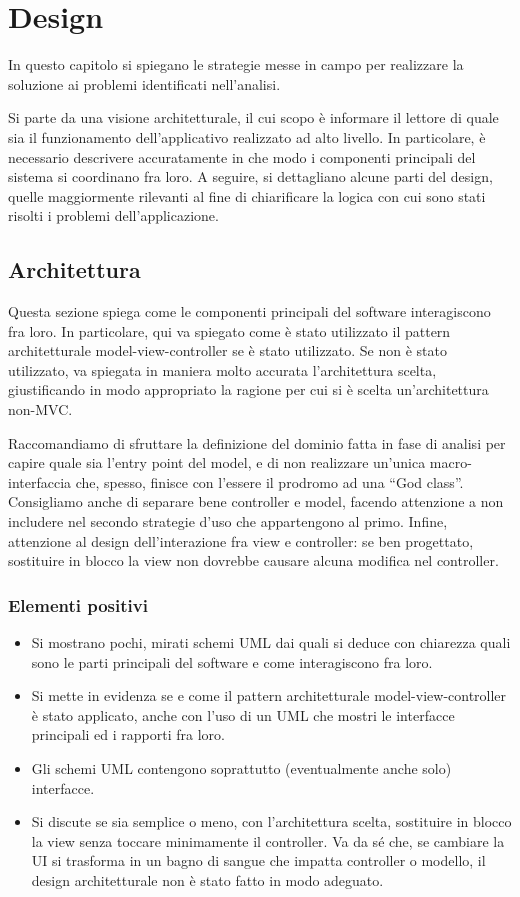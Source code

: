 \documentclass[a4paper,12pt]{report}
\begin{document}
\chapter{Design}

In questo capitolo si spiegano le strategie messe in campo per realizzare la soluzione ai problemi identificati nell'analisi.

Si parte da una visione architetturale, il cui scopo è informare il lettore di quale sia il funzionamento dell'applicativo realizzato ad alto livello.
%
In particolare, è necessario descrivere accuratamente in che modo i componenti principali del sistema si coordinano fra loro.
%
A seguire, si dettagliano alcune parti del design, quelle maggiormente rilevanti al fine di chiarificare la logica con cui sono stati risolti i problemi dell'applicazione.

\section{Architettura}

Questa sezione spiega come le componenti principali del software interagiscono fra loro.
%
In particolare, qui va spiegato come è stato utilizzato il pattern architetturale model-view-controller se è stato utilizzato.
%
Se non è stato utilizzato, va spiegata in maniera molto accurata l'architettura scelta, giustificando in modo appropriato la ragione per cui si è scelta un'architettura non-MVC.

Raccomandiamo di sfruttare la definizione del dominio fatta in fase di analisi per capire quale sia l'entry point del model, e di non realizzare un'unica macro-interfaccia che, spesso, finisce con l'essere il prodromo ad una ``God class''.
%
Consigliamo anche di separare bene controller e model, facendo attenzione a non includere nel secondo strategie d'uso che appartengono al primo.
%
Infine, attenzione al design dell'interazione fra view e controller: se ben progettato, sostituire in blocco la view non dovrebbe causare alcuna modifica nel controller.

\subsection*{Elementi positivi}
\begin{itemize}
 \item Si mostrano pochi, mirati schemi UML dai quali si deduce con chiarezza quali sono le parti principali del software e come interagiscono fra loro.
 \item Si mette in evidenza se e come il pattern architetturale model-view-controller è stato applicato, anche con l'uso di un UML che mostri le interfacce principali ed i rapporti fra loro.
 \item Gli schemi UML contengono soprattutto (eventualmente anche solo) interfacce.
 \item Si discute se sia semplice o meno, con l'architettura scelta, sostituire in blocco la view senza toccare minimamente il controller. Va da sé che, se cambiare la UI si trasforma in un bagno di sangue che impatta controller o modello, il design architetturale non è stato fatto in modo adeguato.
\end{itemize}
\end{document}
